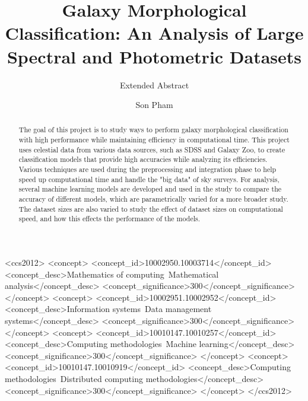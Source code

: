 \documentclass[11pt,sigconf]{acmart}
\begin{document}
\title{Galaxy Morphological Classification: An Analysis of Large Spectral and Photometric Datasets}
\subtitle{Extended Abstract}

\author{Son Pham}


\renewcommand{\shortauthors}{S. Pham}


\begin{abstract}
The goal of this project is to study ways to perform galaxy morphological classification 
with high performance while maintaining efficiency in computational time. This project uses 
celestial data from various data sources, such as SDSS and Galaxy Zoo, to create 
classification models that provide high accuracies while analyzing its efficiencies. 
Various techniques are used during the preprocessing and integration phase to help 
speed up computational time and handle the "big data" of sky surveys. For analysis, several 
machine learning models are developed and used in the study to compare the accuracy of 
different models, which are parametrically varied for a more broader study. The dataset 
sizes are also varied to study the effect of dataset sizes on computational speed, and 
how this effects the performance of the models. 
\end{abstract}

%
%
\begin{CCSXML}
  <ccs2012>
  <concept>
  <concept_id>10002950.10003714</concept_id>
  <concept_desc>Mathematics of computing~Mathematical analysis</concept_desc>
  <concept_significance>300</concept_significance>
  </concept>
  <concept>
  <concept_id>10002951.10002952</concept_id>
  <concept_desc>Information systems~Data management systems</concept_desc>
  <concept_significance>300</concept_significance>
  </concept>
  <concept>
  <concept_id>10010147.10010257</concept_id>
  <concept_desc>Computing methodologies~Machine learning</concept_desc>
  <concept_significance>300</concept_significance>
  </concept>
  <concept>
  <concept_id>10010147.10010919</concept_id>
  <concept_desc>Computing methodologies~Distributed computing methodologies</concept_desc>
  <concept_significance>300</concept_significance>
  </concept>
  </ccs2012>
\end{CCSXML}
\end{document}
